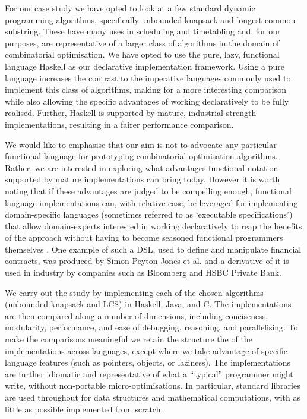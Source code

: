 For our case study we have opted to look at a few standard dynamic
programming algorithms, specifically unbounded knapsack and longest common substring. These have
many uses in scheduling and timetabling and, for our purposes, are
representative of a larger class of algorithms in the domain of combinatorial
optimisation. We have opted to
use the pure, lazy, functional language Haskell \cite{Haskell98Book} as our declarative implementation framework. Using a pure language increases the contrast to the imperative languages commonly used
to implement this class of algorithms, making for a more interesting
comparison while also allowing the specific advantages of working
declaratively
to be fully realised. Further, Haskell is supported by mature,
industrial-strength implementations, resulting in a fairer performance
comparison.

We would like to emphasise that our aim is not to advocate any particular
functional language for prototyping combinatorial optimisation algorithms.
Rather, we are interested in exploring what advantages functional notation
supported by mature implementations can bring today. However it is
worth noting that if these
advantages are judged to be compelling enough, functional
language implementations can, with relative ease, be leveraged for
implementing domain-specific languages (sometimes referred to as `executable specifications') that allow domain-experts interested in
working declaratively to reap the benefits of the approach without having to
become seasoned functional programmers themselves \cite{Hudak1998}. One example
of such a DSL, used to define and manipulate financial contracts,
was produced by Simon Peyton Jones et al. \cite{contracts} and
a derivative of it is used in industry by companies such as Bloomberg
and HSBC Private Bank.

We carry out the study by implementing each of the chosen algorithms (unbounded
knapsack and LCS) in
Haskell, Java, and C. The implementations are then compared along a number
of dimensions, including conciseness, modularity, performance, and ease of debugging, reasoning, and parallelising. To make the comparisons meaningful we retain the structure the
of the implementations across languages, except where we take advantage of
specific language features (such as pointers, objects, or laziness). The
implementations are further idiomatic and representative of what a
``typical'' programmer might write, without non-portable micro-optimisations.
In particular, standard libraries are used throughout for data structures and
mathematical computations, with as little as possible implemented from
scratch.


